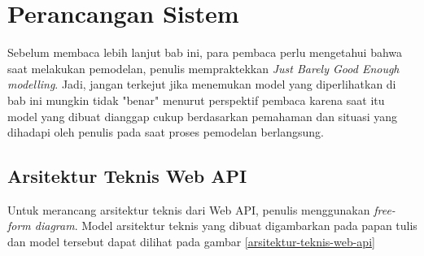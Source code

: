 \documentclass[a4paper, 12pt, oneside]{report}
\begin{document}
\chapter{Perancangan Sistem} \label{bab:4}

\onehalfspacing Sebelum membaca lebih lanjut bab ini, para pembaca perlu mengetahui bahwa saat melakukan pemodelan, penulis mempraktekkan \textit{Just Barely Good Enough modelling}\cite{jbge-scott}. Jadi, jangan terkejut jika menemukan model yang diperlihatkan di bab ini mungkin tidak "benar" menurut perspektif pembaca karena saat itu model yang dibuat dianggap cukup berdasarkan pemahaman dan situasi yang dihadapi oleh penulis pada saat proses pemodelan berlangsung.

\section{Arsitektur Teknis Web API}

Untuk merancang arsitektur teknis dari Web API, penulis menggunakan \textit{free-form diagram}. Model arsitektur teknis yang dibuat digambarkan pada papan tulis dan model tersebut dapat dilihat pada gambar \ref{arsitektur-teknis-web-api}

\newpage
\end{document}
